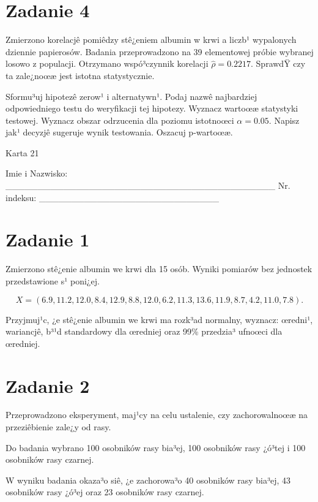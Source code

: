 \documentclass[a4paper,12pt]{article}
\begin{document}
  \section*{Zadanie 4}
     
     Zmierzono korelacjê pomiêdzy stê¿eniem albumin w krwi a liczb¹ wypalonych dziennie papierosów. 
     Badania przeprowadzono na 39 elementowej próbie wybranej losowo z populacji. 
     Otrzymano wspó³czynnik korelacji $\hat\rho = 0.2217 $. 
     SprawdŸ czy ta zale¿noœæ jest istotna statystycznie. 
     
     Sformu³uj hipotezê zerow¹ i alternatywn¹. 
     Podaj nazwê najbardziej odpowiedniego testu do weryfikacji tej hipotezy. 
     Wyznacz wartoœæ statystyki testowej. 
     Wyznacz obszar odrzucenia dla poziomu istotnoœci $\alpha=0.05$. 
     Napisz jak¹ decyzjê sugeruje wynik testowania. 
     Oszacuj p-wartoœæ. \vspace{1cm} 

  \clearpage  Karta  21  

 Imie i Nazwisko: \_\_\_\_\_\_\_\_\_\_\_\_\_\_\_\_\_\_\_\_\_\_\_\_\_\_\_\_\_\_\_\_\_\_\_\_\_\_\_\_\_\_ Nr. indeksu: \_\_\_\_\_\_\_\_\_\_\_\_\_\_\_\_\_\_\_\_\_\_\_\_\_\_\_\_ 
 \section*{Zadanie 1}
     
     Zmierzono stê¿enie albumin we krwi dla 15 osób. 
     Wyniki pomiarów bez jednostek przedstawione s¹ poni¿ej. 
     
     \noindent $$X=(  6.9, 11.2, 12.0,  8.4, 12.9,  8.8, 12.0,  6.2, 11.3, 13.6, 11.9,  8.7,  4.2, 11.0,  7.8 ).$$
     
     Przyjmuj¹c, ¿e stê¿enie albumin we krwi ma rozk³ad normalny, 
     wyznacz: œredni¹, wariancjê, b³¹d standardowy dla œredniej oraz 99\% przedzia³ ufnoœci dla œredniej. \vspace{1cm} 

  \section*{Zadanie 2}
     
  Przeprowadzono eksperyment, maj¹cy na celu ustalenie, czy zachorowalnoœæ na przeziêbienie zale¿y od rasy.
  
  Do badania wybrano 100 osobników rasy bia³ej, 100 osobników rasy ¿ó³tej i 100 osobników rasy czarnej. 
  
  W wyniku badania okaza³o siê, ¿e zachorowa³o 40 osobników rasy bia³ej, 43 osobników rasy ¿ó³ej oraz 23 osobników rasy czarnej. 
  
\end{document}
